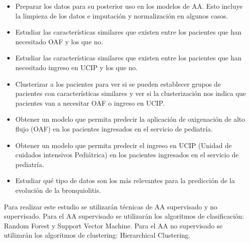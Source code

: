 \begin{itemize}
    \item Preparar los datos para su posterior uso en los modelos de AA. Esto incluye la limpieza de los datos e imputación y normalización en algunos casos. 
    \item Estudiar las características similares que existen entre los pacientes que han necesitado OAF y los que no.
    \item Estudiar las características similares que existen entre los pacientes que han necesitado ingreso en UCIP y los que no.
    \item Clusterizar a los pacientes para ver si se pueden establecer grupos de pacientes con características similares y ver si la clusterización nos indica que pacientes van a necesitar OAF o ingreso en UCIP.
    \item Obtener un modelo que permita predecir la aplicación de oxigenación de alto flujo (OAF) en los pacientes ingresados en el servicio de pediatría.
    \item Obtener un modelo que permita predecir el ingreso en UCIP (Unidad de cuidados intensivos Pediátrica) en los pacientes ingresados en el servicio de pediatría.
    \item Estudiar qué tipo de datos son los más relevantes para la predicción de la evolución de la bronquiolitis.
\end{itemize}


Para realizar este estudio se utilizarán técnicas de AA supervisado y no supervisado. Para el AA supervisado se utilizarán los algoritmos de clasificación: Random Forest y Support Vector Machine. Para el AA no supervisado se utilizarán los algoritmos de clustering: Hierarchical Clustering.

